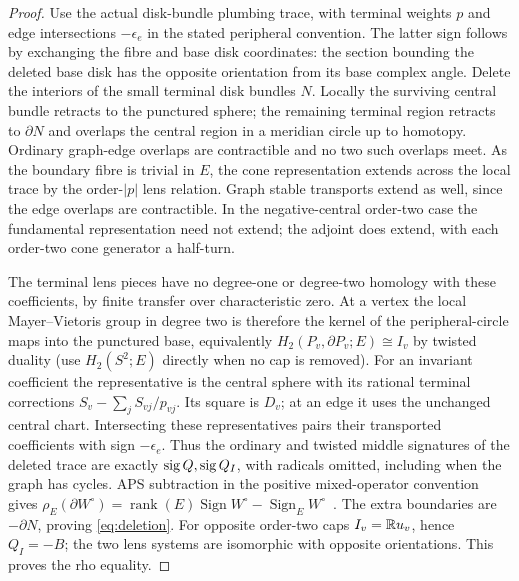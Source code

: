\begin{proof}
Use the actual disk-bundle plumbing trace, with terminal weights \(p\) and edge intersections \(-\epsilon_e\) in the stated peripheral convention. The latter sign follows by exchanging the fibre and base disk coordinates: the section bounding the deleted base disk has the opposite orientation from its base complex angle. Delete the interiors of the small terminal disk bundles \(N\). Locally the surviving central bundle retracts to the punctured sphere; the remaining terminal region retracts to \(\partial N\) and overlaps the central region in a meridian circle up to homotopy. Ordinary graph-edge overlaps are contractible and no two such overlaps meet. As the boundary fibre is trivial in \(E\), the cone representation extends across the local trace by the order-\(|p|\) lens relation. Graph stable transports extend as well, since the edge overlaps are contractible. In the negative-central order-two case the fundamental representation need not extend; the adjoint does extend, with each order-two cone generator a half-turn.

The terminal lens pieces have no degree-one or degree-two homology with these coefficients, by finite transfer over characteristic zero. At a vertex the local Mayer--Vietoris group in degree two is therefore the kernel of the peripheral-circle maps into the punctured base, equivalently \(H_2(P_v,\partial P_v;E)\cong I_v\) by twisted duality (use \(H_2(S^2;E)\) directly when no cap is removed). For an invariant coefficient the representative is the central sphere with its rational terminal corrections \(S_v-\sum_jS_{vj}/p_{vj}\). Its square is \(D_v\); at an edge it uses the unchanged central chart. Intersecting these representatives pairs their transported coefficients with sign \(-\epsilon_e\). Thus the ordinary and twisted middle signatures of the deleted trace are exactly \(\operatorname{sig} Q,\operatorname{sig} Q_I\), with radicals omitted, including when the graph has cycles. APS subtraction in the positive mixed-operator convention gives \(\rho_E(\partial W^\circ)=\operatorname{rank}(E)\operatorname{Sign} W^\circ-\operatorname{Sign}_E W^\circ\)~\cite{APS,KKR}. The extra boundaries are \(-\partial N\), proving \eqref{eq:deletion}. For opposite order-two caps \(I_v=\mathbb R u_v\), hence \(Q_I=-B\); the two lens systems are isomorphic with opposite orientations. This proves the rho equality.


\end{proof}
